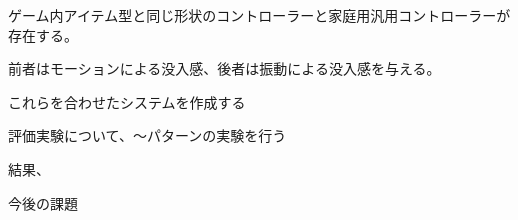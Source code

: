 ゲーム内アイテム型と同じ形状のコントローラーと家庭用汎用コントローラーが存在する。

前者はモーションによる没入感、後者は振動による没入感を与える。

これらを合わせたシステムを作成する

評価実験について、～パターンの実験を行う

結果、

今後の課題